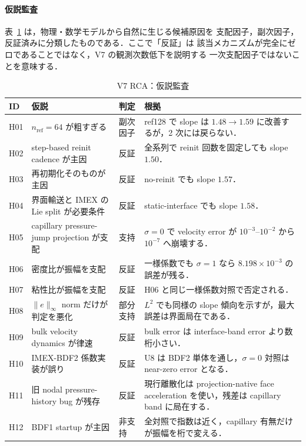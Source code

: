 \paragraph{仮説監査}

表~\ref{tab:v7_rca_hypotheses} は，物理・数学モデルから自然に生じる候補原因を
支配因子，副次因子，反証済みに分類したものである．ここで「反証」は
該当メカニズムが完全にゼロであることではなく，V7 の観測次数低下を説明する
一次支配因子ではないことを意味する．

\begin{table}[htbp]
\centering\scriptsize
\caption{V7 RCA：仮説監査}
\label{tab:v7_rca_hypotheses}
\begin{tabularx}{\linewidth}{>{\raggedright\arraybackslash}p{9mm}X>{\raggedright\arraybackslash}p{23mm}X}
\toprule
ID & 仮説 & 判定 & 根拠 \\
\midrule
H01 & $n_{\mathrm{ref}}=64$ が粗すぎる & 副次因子 &
ref128 で slope は $1.48\to1.59$ に改善するが，2 次には戻らない．\\
H02 & step-based reinit cadence が主因 & 反証 &
全系列で reinit 回数を固定しても slope $1.50$．\\
H03 & 再初期化そのものが主因 & 反証 &
no-reinit でも slope $1.57$．\\
H04 & 界面輸送と IMEX の Lie split が必要条件 & 反証 &
static-interface でも slope $1.58$．\\
H05 & capillary pressure-jump projection が支配 & 支持 &
$\sigma=0$ で velocity error が $10^{-3}$--$10^{-2}$ から $10^{-7}$ へ崩壊する．\\
H06 & 密度比が振幅を支配 & 反証 &
一様係数でも $\sigma=1$ なら $8.198\times10^{-3}$ の誤差が残る．\\
H07 & 粘性比が振幅を支配 & 反証 &
H06 と同じ一様係数対照で否定される．\\
H08 & $\|e\|_\infty$ norm だけが判定を悪化 & 部分支持 &
$L^2$ でも同様の slope 傾向を示すが，最大誤差は界面局在である．\\
H09 & bulk velocity dynamics が律速 & 反証 &
bulk error は interface-band error より数桁小さい．\\
H10 & IMEX-BDF2 係数実装が誤り & 反証 &
U8 は BDF2 単体を通し，$\sigma=0$ 対照は near-zero error となる．\\
H11 & 旧 nodal pressure-history bug が残存 & 反証 &
現行離散化は projection-native face acceleration を使い，残差は capillary band に局在する．\\
H12 & BDF1 startup が主因 & 非支持 &
全対照で指数は近く，capillary 有無だけが振幅を桁で変える．\\

\end{tabularx}
\end{table}
